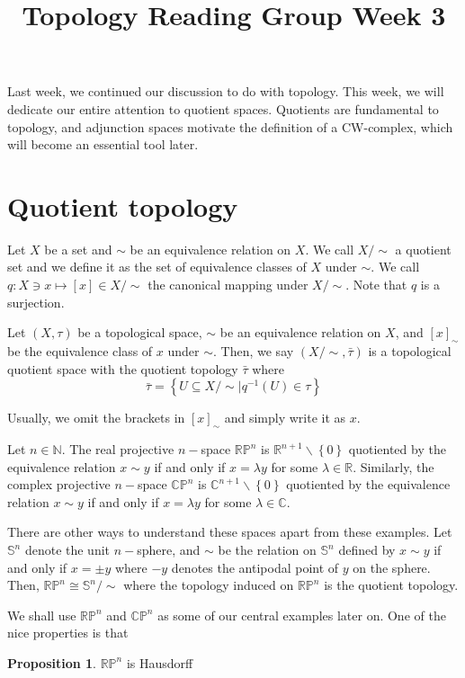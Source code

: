 \documentclass[12pt,reqno]{amsart}
\numberwithin{theorem}{section}
\theoremstyle{definition}
\theoremstyle{remark}
\numberwithin{equation}{section}
\newcommand{\C}{\mathbb C}
\newcommand{\N}{\mathbb N}
\renewcommand{\S}{\mathbb S}
\renewcommand{\P}{\mathbb{P}}
\newcommand{\set}[1]{\left \{ #1 \right \}}
\theoremstyle{definition}
\newtheorem{prop}[theorem]{Proposition}
\newcommand{\R}{\mathbb{R}}
\begin{document}
\title{Topology Reading Group Week 3}
\maketitle
Last week, we continued our discussion to do with topology. This week, we will dedicate our entire attention to quotient spaces. Quotients are fundamental to topology, and adjunction spaces motivate the definition of a CW-complex, which will become an essential tool later.
\section{Quotient topology}
\begin{definition}
    Let $X$ be a set and $\sim$ be an equivalence relation on $X$. We call $X/\sim$ a quotient set and we define it as the set of equivalence classes of $X$ under $\sim$. We call $q:X \ni x \mapsto [x] \in X/\sim$ the canonical mapping under $X/\sim$. Note that $q$ is a surjection.
\end{definition}
\begin{definition}
    Let $(X,\tau)$ be a topological space, $\sim$ be an equivalence relation on $X$, and $[x]_\sim$ be the equivalence class of $x$ under $\sim$. Then, we say $(X/\sim,\bar{\tau})$ is a topological quotient space with the quotient topology $\bar{\tau}$ where
    $$\bar{\tau} = \set{U \subseteq X/\sim \mid q^{-1}(U) \in \tau}$$
\end{definition}
Usually, we omit the brackets in $[x]_\sim$ and simply write it as $x$.
\begin{example}
    Let $n \in \N$. The real projective $n-$space $\R\P^n$ is $\R^{n+1}\backslash \set{0}$ quotiented by the equivalence relation $x \sim y$ if and only if $x= \lambda y$ for some $\lambda \in \R$. Similarly, the complex projective $n-$space $\C\P^n$ is $\C^{n+1}\backslash \set{0}$ quotiented by the equivalence relation $x \sim y$ if and only if $x= \lambda y$ for some $\lambda \in \C$. 

    There are other ways to understand these spaces apart from these examples. Let $\S^n$ denote the unit $n-$sphere, and $\sim$ be the relation on $\S^n$ defined by $x \sim y$ if and only if $x = \pm y$ where $-y$ denotes the antipodal point of $y$ on the sphere. Then, $\mathbb{R}\P^n \cong \S^n/\sim$ where the topology induced on $\mathbb{R}\P^n$ is the quotient topology. 
\end{example}
We shall use $\R\P^n$ and $\C\P^n$ as some of our central examples later on. One of the nice properties is that
\begin{prop}
    $\mathbb{R}\P^n$ is Hausdorff
\end{prop}
\end{document}
